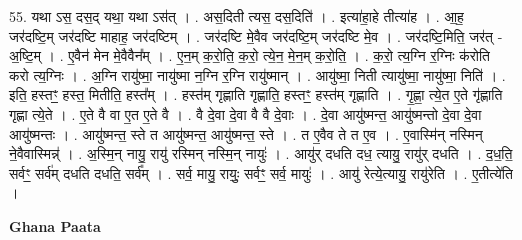 \documentclass[17pt]{extarticle}
\begin{document}
55. यथा ऽस॒ दस॒द् यथा॒ यथा ऽस॑त् । . अस॒दिती त्यस॒ दस॒दिति॑ । . इत्या॑हा॒हे तीत्या॑ह । . आ॒ह॒ जर॑दष्टि॒म् जर॑दष्टि माहाह॒ जर॑दष्टिम् । . जर॑दष्टि मे॒वैव जर॑दष्टि॒म् जर॑दष्टि मे॒व । . जर॑दष्टि॒मिति॒ जर॑त् - अ॒ष्टि॒म् । . ए॒वैन॑ मेन मे॒वैवैन᳚म् । . ए॒न॒म् क॒रो॒ति॒ क॒रो॒ त्ये॒न॒ मे॒न॒म् क॒रो॒ति॒ । . क॒रो॒ त्य॒ग्नि र॒ग्निः क॑रोति करो त्य॒ग्निः । . अ॒ग्नि रायु॑ष्मा॒ नायु॑ष्मा न॒ग्नि र॒ग्नि रायु॑ष्मान् । . आयु॑ष्मा॒ निती त्यायु॑ष्मा॒ नायु॑ष्मा॒ निति॑ । . इति॒ हस्तꣳ॒॒ हस्त॒ मितीति॒ हस्त᳚म् । . हस्त॑म् गृह्णाति गृह्णाति॒ हस्तꣳ॒॒ हस्त॑म् गृह्णाति । . गृ॒ह्णा॒ त्ये॒त ए॒ते गृ॑ह्णाति गृह्णा त्ये॒ते । . ए॒ते वै वा ए॒त ए॒ते वै । . वै दे॒वा दे॒वा वै वै दे॒वाः । . दे॒वा आयु॑ष्मन्त॒ आयु॑ष्मन्तो दे॒वा दे॒वा आयु॑ष्मन्तः । . आयु॑ष्मन्त॒ स्ते त आयु॑ष्मन्त॒ आयु॑ष्मन्त॒ स्ते । . त ए॒वैव ते त ए॒व । . ए॒वास्मि॑न् नस्मिन् ने॒वैवास्मिन्न्॑ । . अ॒स्मि॒न् नायु॒ रायु॑ रस्मिन् नस्मि॒न् नायुः॑ । . आयु॑र् दधति दध॒ त्यायु॒ रायु॑र् दधति । . द॒ध॒ति॒ सर्वꣳ॒॒ सर्व॑म् दधति दधति॒ सर्व᳚म् । . सर्व॒ मायु॒ रायुः॒ सर्वꣳ॒॒ सर्व॒ मायुः॑ । . आयु॑ रेत्ये॒त्यायु॒ रायु॑रेति । . ए॒तीत्ये॑ति । \newline

\textbf{Ghana Paata } \newline
\end{document}

